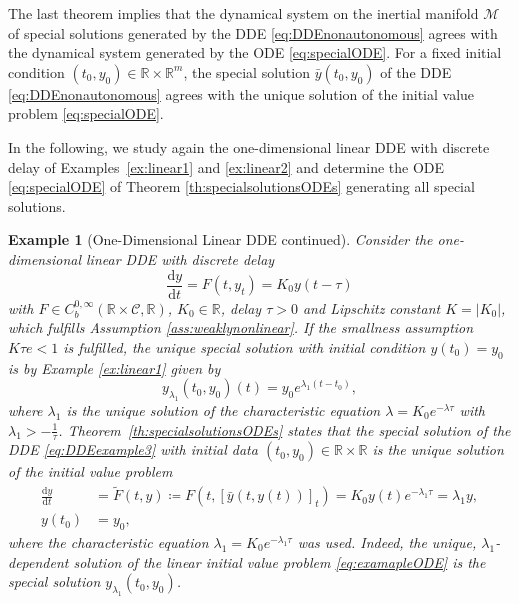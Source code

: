 \documentclass[10pt]{article}
\numberwithin{equation}{section}
\newcommand*{\dd}{\mathrm{d}}
\newtheorem{example}[theorem]{Example}
\newcommand\abs[1]{\left\lvert#1\right\rvert}
\begin{document}
	The last theorem implies that the dynamical system on the inertial manifold $\mathcal{M}$ of special solutions generated by the DDE  \eqref{eq:DDEnonautonomous} agrees with the dynamical system generated by the ODE \eqref{eq:specialODE}. For a fixed initial condition $(t_0,y_0) \in \mathbb{R}\times \mathbb{R}^m$, the special solution $\bar{y}(t_0,y_0)$ of the DDE \eqref{eq:DDEnonautonomous} agrees with the unique solution of the initial value problem \eqref{eq:specialODE}. 
	
	In the following, we study again the one-dimensional linear DDE with discrete delay of Examples~\ref{ex:linear1} and \ref{ex:linear2} and determine the ODE \eqref{eq:specialODE} of Theorem \ref{th:specialsolutionsODEs} generating all special solutions.
	
	
	\begin{example}[One-Dimensional Linear DDE continued]  \label{ex:linear3} \normalfont
		Consider the one-dimensional linear DDE with discrete delay
		\begin{equation} \label{eq:DDEexample3}
			\frac{\dd y}{\dd t} = F(t,y_t) = K_0 y(t-\tau)
		\end{equation}
		with $F\in C^{0,\infty}_b(\mathbb{R}\times \mathcal{C},\mathbb{R})$, $K_0 \in \mathbb{R}$, delay $\tau>0$ and Lipschitz constant $K = \abs{K_0}$, which fulfills Assumption \ref{ass:weaklynonlinear}.  If the smallness assumption $K\tau e<1$ is fulfilled, the unique special solution with initial condition $y(t_0) = y_0$ is by Example \ref{ex:linear1} given by
		\begin{equation*}
			y_{\lambda_1}(t_0,y_0)(t) = y_0e^{\lambda_1(t-t_0)},
		\end{equation*}
		where $\lambda_1$ is the unique solution of the characteristic equation $\lambda = K_0 e^{-\lambda \tau}$ with $\lambda_1 > - \frac{1}{\tau}$. Theorem~\ref{th:specialsolutionsODEs} states that the special solution of the DDE \eqref{eq:DDEexample3} with initial data $(t_0,y_0)\in\mathbb{R}\times\mathbb{R}$ is the unique solution of the initial value problem
		\begin{equation} \label{eq:examapleODE}
			\begin{aligned}
				\frac{\dd y}{\dd t} &= \widetilde{F}(t,y) \coloneqq F(t,[\bar{y}(t,y(t))]_t) = K_0 y(t) e^{-\lambda_1 \tau}  = \lambda_1 y, \\
				y(t_0) &= y_0,
			\end{aligned}
		\end{equation}
		where the characteristic equation $\lambda_1 = K_0 e^{-\lambda_1 \tau}$ was used.
		Indeed, the unique, $\lambda_1$-dependent solution of the linear initial value problem \eqref{eq:examapleODE} is the special solution $y_{\lambda_1}(t_0,y_0)$.
	\end{example}
	
\end{document}
